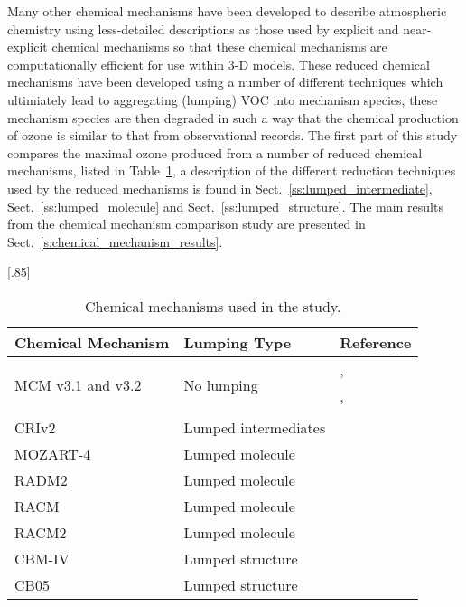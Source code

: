 Many other chemical mechanisms have been developed to describe atmospheric chemistry using less-detailed descriptions as those used by explicit and near-explicit chemical mechanisms so that these chemical mechanisms are computationally efficient for use within 3-D models.
These reduced chemical mechanisms have been developed using a number of different techniques which ultimiately lead to aggregating (lumping) VOC into mechanism species, these mechanism species are then degraded in such a way that the chemical production of ozone is similar to that from observational records.
The first part of this study compares the maximal ozone produced from a number of reduced chemical mechanisms, listed in Table~\ref{t:mechanisms}, a description of the different reduction techniques used by the reduced mechanisms is found in Sect.~\ref{ss:lumped_intermediate}, Sect.~\ref{ss:lumped_molecule} and Sect.~\ref{ss:lumped_structure}.
The main results from the chemical mechanism comparison study are presented in Sect.~\ref{s:chemical_mechanism_results}.

\begin{table}
    \begin{center}
        \caption{Chemical mechanisms used in the study.}
        \scalebox{.85}[.85]{\begin{tabular}{lll}
                \hline \hline
                \textbf{Chemical Mechanism} & \textbf{Lumping Type} & \textbf{Reference} \\
                \hline \hline
                \multirow{3}{*}{MCM v3.1 and v3.2} & \multirow{3}{*}{No lumping} & \citet{Jenkin:1997}, \citet{Jenkin:2003} \\
                & & \citet{Saunders:2003}, \citet{Bloss:2005} \\
                & & \citet{MCM_Site} \\
                CRIv2 & Lumped intermediates & \citet{Jenkin:2008} \\
                MOZART-4 & Lumped molecule & \citet{Emmons:2010} \\
                RADM2 & Lumped molecule & \citet{Stockwell:1990} \\
                RACM & Lumped molecule & \citet{Stockwell:1997} \\
                RACM2 & Lumped molecule & \citet{Goliff:2013} \\
                CBM-IV & Lumped structure & \citet{Gery:1989} \\
                CB05 & Lumped structure & \citet{Yarwood:2005} \\
                \hline \hline
            \end{tabular}
        }
        \label{t:mechanisms}
    \end{center}
\end{table}

